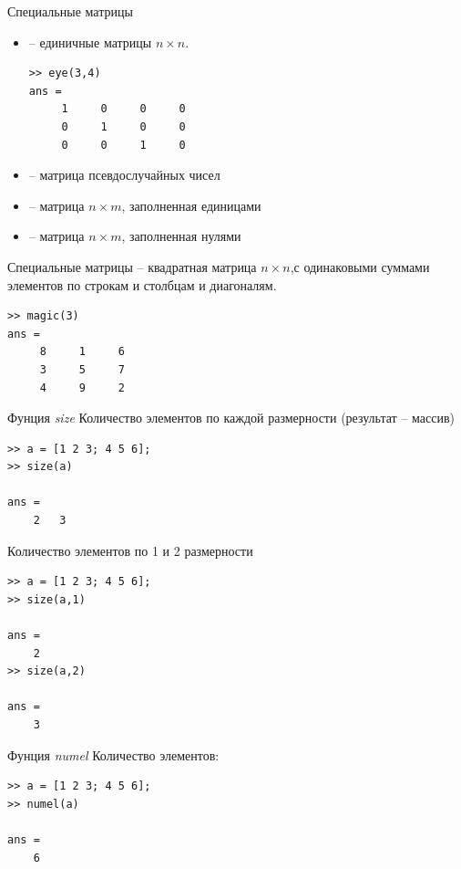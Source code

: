 \documentclass[11pt, compress]{beamer}
\begin{document}
\begin{frame}[fragile]{Специальные матрицы}  
  \begin{itemize}
    \item {} -- единичные матрицы $n \times n$.
\begin{lstlisting}
>> eye(3,4)
ans =
     1     0     0     0
     0     1     0     0
     0     0     1     0  
\end{lstlisting}
    \item {} -- матрица псевдослучайных чисел
    \item {} -- матрица $n \times m$, заполненная единицами
    \item {} -- матрица $n \times m$, заполненная нулями
  \end{itemize}
\end{frame}

\begin{frame}[fragile]{Специальные матрицы}  
 -- квадратная матрица $n \times n$,с одинаковыми суммами элементов по строкам и столбцам и диагоналям.
\begin{lstlisting}
>> magic(3)
ans =
     8     1     6
     3     5     7
     4     9     2
\end{lstlisting}
\end{frame}

\begin{frame}[fragile]{Фунция \emph{size}}  
Количество элементов по каждой размерности (результат -- массив)
\begin{lstlisting}
>> a = [1 2 3; 4 5 6];
>> size(a)

ans = 
    2   3
\end{lstlisting}
Количество элементов по 1 и 2 размерности 
\begin{lstlisting}
>> a = [1 2 3; 4 5 6];
>> size(a,1)

ans = 
    2
>> size(a,2)    

ans = 
    3
\end{lstlisting}
\end{frame}

\begin{frame}[fragile]{Фунция \emph{numel}}  
Количество элементов:
\begin{lstlisting}
>> a = [1 2 3; 4 5 6];
>> numel(a)

ans = 
    6
\end{lstlisting}
\end{frame}
\end{document}
